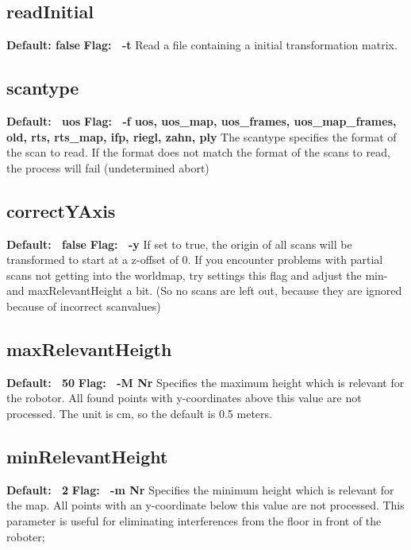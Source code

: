 \documentclass{article}
\begin{document}
\subsection{readInitial}
{\bf Default: false} \newline
{\bf Flag: \ -t} \newline
Read a file containing a initial transformation matrix.


\subsection{scantype}
{\bf Default: \ uos} \newline
{\bf Flag: \ -f {uos, uos_map, uos_frames, uos_map_frames, old, rts, rts_map, ifp, riegl, zahn, ply}} \newline
The scantype specifies the format of the scan to read. If the format does not
match the format of the scans to read, the process will fail (undetermined
abort)

\subsection{correctYAxis}
{\bf Default: \ false} \newline
{\bf Flag: \ -y} \newline
If set to true, the origin of all scans will be transformed to start at a
z-offset of 0. If you encounter problems with partial scans not getting into
the worldmap, try settings this flag and adjust the min- and maxRelevantHeight
a bit. (So no scans are left out, because they are ignored because of incorrect
scanvalues)

\subsection{maxRelevantHeigth}
{\bf Default: \ 50} \newline
{\bf Flag: \ -M Nr} \newline
Specifies the maximum height which is relevant for the robotor. All found
points with y-coordinates above this value are not processed.
The unit is cm, so the default is 0.5 meters.


\subsection{minRelevantHeight}
{\bf Default: \ 2} \newline
{\bf Flag: \ -m Nr} \newline
Specifies the minimum height which is relevant for the map. All points with an y-coordinate below this value are not processed. 
This parameter is useful for eliminating interferences from the floor in front of the roboter;
\end{document}
